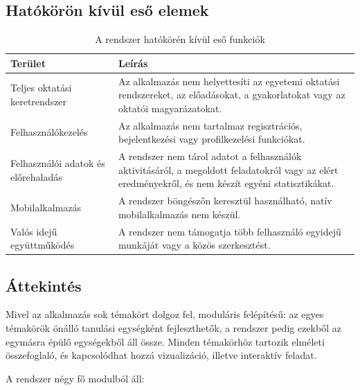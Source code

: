 \documentclass[12pt,a4paper]{report}
\begin{document}
\subsection{Hatókörön kívül eső elemek}

\begin{table}[htbp]
    \centering
    \begin{tabularx}{\textwidth}{p{4.2cm} X}
        \toprule
        \textbf{Terület} & \textbf{Leírás} \\
        \midrule
        Teljes oktatási keretrendszer &
        Az alkalmazás nem helyettesíti az egyetemi oktatási
        rendszereket, az előadásokat, a gyakorlatokat vagy az oktatói
        magyarázatokat. \\
        Felhasználókezelés &
        Az alkalmazás nem tartalmaz regisztrációs, bejelentkezési vagy
        profilkezelési funkciókat. \\
        Felhasználói adatok és előrehaladás &
        A rendszer nem tárol adatot a felhasználók aktivitásáról, a
        megoldott feladatokról vagy az elért eredményekről, és nem
        készít egyéni statisztikákat. \\
        Mobilalkalmazás &
        A rendszer böngészőn keresztül használható, natív
        mobilalkalmazás nem készül. \\
        Valós idejű együttműködés &
        A rendszer nem támogatja több felhasználó egyidejű munkáját
        vagy a közös szerkesztést. \\
        \bottomrule
    \end{tabularx}
    \caption{A rendszer hatókörén kívül eső funkciók}
    \label{tab:out_of_scope}
\end{table}

\subsection{Áttekintés}

Mivel az alkalmazás sok témakört dolgoz fel, moduláris felépítésű: az
egyes témakörök önálló tanulási egységként fejleszthetők, a rendszer
pedig ezekből az egymásra épülő egységekből áll össze. Minden
témakörhöz tartozik elméleti összefoglaló, és kapcsolódhat hozzá
vizualizáció, illetve interaktív feladat.

A rendszer négy fő modulból áll:
\end{document}
